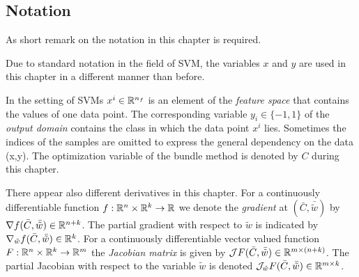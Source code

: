 

\subsection{Notation}

As short remark on the notation in this chapter is required.

Due to standard notation in the field of SVM, the variables \(x\) and \(y\) are used in this chapter in a different manner than before.

In the setting of SVMs \(x^i \in \mathbb{R}^{n_f}\) is an element of the \emph{feature space} that contains the values of one data point. The corresponding variable \(y_i \in \{-1,1\}\) of the \emph{output domain} contains the class in which the data point \(x^i\) lies. Sometimes the indices of the samples are omitted to express the general dependency on the data (x,y).
The optimization variable of the bundle method is denoted by \(C\) during this chapter.


There appear also different derivatives in this chapter.
For a continuously differentiable function \(f:\mathbb{R}^n \times \mathbb{R}^k \to \mathbb{R}\) we denote the \emph{gradient} at \((\bar{C},\bar{\tilde{w}})\) by \(\nabla f(\bar{C},\bar{\tilde{w}}) \in \mathbb{R}^{n+k}\). The partial gradient with respect to \(\tilde{w}\) is indicated by \(\nabla_{\tilde{w}}f(\bar{C},\bar{\tilde{w}}) \in \mathbb{R}^k \). %
For a continuously differentiable vector valued function \(F:\mathbb{R}^n \times \mathbb{R}^k \to \mathbb{R}^m\) the \emph{Jacobian matrix} is given by \( \mathcal{J}F(\bar{C},\bar{\tilde{w}}) \in \mathbb{R}^{m \times (n+k)}\). The partial Jacobian with respect to the variable \(\tilde{w}\) is denoted \(\mathcal{J}_{\tilde{w}} F(\bar{C},\bar{\tilde{w}}) \in \mathbb{R}^{m \times k}\).

